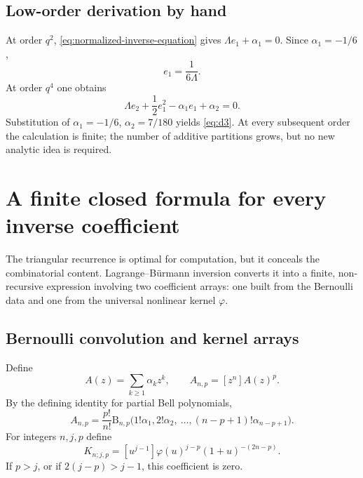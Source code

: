 \documentclass[11pt,a4paper,oneside]{article}
\theoremstyle{plain}
\theoremstyle{definition}
\theoremstyle{remark}
\newcommand{\coeff}[2]{\left[#1^{#2}\right]}
\newcommand{\BellP}[2]{\mathrm B_{#1,#2}}
\begin{document}
\subsection{Low-order derivation by hand}

At order $q^2$, \cref{eq:normalized-inverse-equation} gives
$\Lambda e_1+\alpha_1=0$.  Since $\alpha_1=-1/6$,
\[
 e_1=\frac1{6\Lambda}.
\]
At order $q^4$ one obtains
\begin{equation}
 \Lambda e_2+\frac12e_1^2-\alpha_1e_1+\alpha_2=0.
 \label{eq:e2-hand}
\end{equation}
Substitution of $\alpha_1=-1/6$, $\alpha_2=7/180$ yields
\cref{eq:d3}.  At every subsequent order the calculation is finite; the
number of additive partitions grows, but no new analytic idea is required.

\section{A finite closed formula for every inverse coefficient}
\label{sec:closed-coefficients}

The triangular recurrence is optimal for computation, but it conceals the
combinatorial content.  Lagrange--B\"urmann inversion converts it into a finite,
non-recursive expression involving two coefficient arrays: one built from the
Bernoulli data and one from the universal nonlinear kernel $\varphi$.

\subsection{Bernoulli convolution and kernel arrays}

Define
\begin{equation}
 A(z)=\sum_{k\ge1}\alpha_kz^k,
 \qquad
 A_{n,p}=\coeff{z}{n}A(z)^p.
 \label{eq:A-np-def}
\end{equation}
By the defining identity for partial Bell polynomials,
\begin{equation}
 A_{n,p}=\frac{p!}{n!}
 \BellP{n}{p}\bigl(1!\alpha_1,2!\alpha_2,\
 \ldots,(n-p+1)!\alpha_{n-p+1}\bigr).
 \label{eq:A-np-bell}
\end{equation}
For integers $n,j,p$ define
\begin{equation}
 K_{n;j,p}=\coeff{u}{j-1}
 \varphi(u)^{j-p}(1+u)^{-(2n-p)}.
 \label{eq:K-def}
\end{equation}
If $p>j$, or if $2(j-p)>j-1$, this coefficient is zero.
\end{document}
